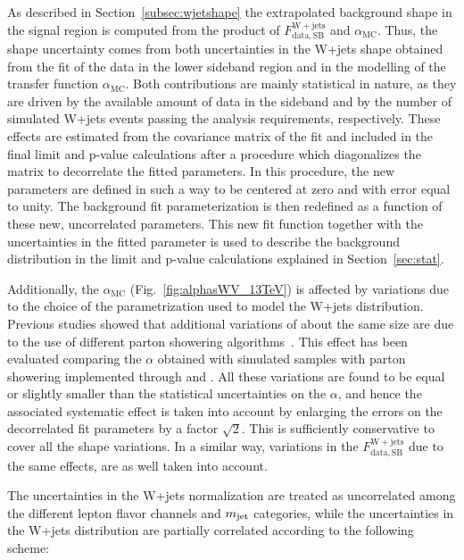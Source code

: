 As described in Section~\ref{subsec:wjetshape} the extrapolated background shape in the signal region is computed from the product of $F_\mathrm{data, SB}^{\mathrm{W+jets}}$ and $\alpha_\mathrm{MC}$.
Thus, the shape uncertainty comes from both uncertainties in the W+jets \mlvj shape obtained from the fit of the data in the lower \mJ sideband region and in the modelling of the transfer function $\alpha_\mathrm{MC}$.
Both contributions are mainly statistical in nature, as they are driven by the available amount of data in the sideband and by the number of simulated W+jets events passing the analysis requirements, respectively.
These effects are estimated from the covariance matrix of the fit and included in the final limit and p-value calculations after a procedure which diagonalizes the matrix to decorrelate the fitted parameters.
In this procedure, the new parameters are defined in such a way to be centered at zero and with error equal to unity. The background fit parameterization is then redefined as a function of these new, uncorrelated parameters.
This new fit function together with the uncertainties in the fitted parameter is used to describe the background distribution in the limit and p-value calculations explained in Section~\ref{sec:stat}.

Additionally, the $\alpha_\mathrm{MC}$ (Fig.~\ref{fig:alphasWV_13TeV}) is affected by variations due to the choice of the parametrization used to model the W+jets distribution.
Previous studies showed that additional variations of about the same size are due to the use of different parton showering algorithms~\cite{Khachatryan:2014gha}. This effect has been evaluated comparing the $\alpha$ obtained with simulated samples with parton showering implemented through \HERWIG{++} and \PYTHIA{}. All these variations are found to be equal or slightly smaller than the statistical uncertainties on the $\alpha$, and hence the associated systematic effect is taken into account by enlarging the errors on the decorrelated fit parameters by a factor $\sqrt{2}$. This is sufficiently conservative to cover all the shape variations.
In a similar way, variations in the $F_\mathrm{data, SB}^{\mathrm{W+jets}}$ due to the same effects, are as well taken into account.

The uncertainties in the W+jets normalization are treated as uncorrelated among the different lepton flavor channels and $m_{\text{jet}}$ categories, while the uncertainties in the W+jets distribution are partially correlated
according to the following scheme:

